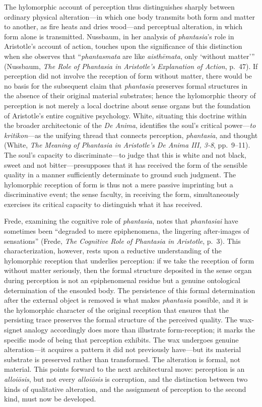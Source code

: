 \documentclass[12pt]{article}
\begin{document}
The hylomorphic account of perception thus distinguishes sharply between ordinary physical alteration---in which one body transmits both form and matter to another, as fire heats and dries wood---and perceptual alteration, in which form alone is transmitted. Nussbaum, in her analysis of \textit{phantasia}'s role in Aristotle's account of action, touches upon the significance of this distinction when she observes that ``\textit{phantasmata} are like \textit{aisthēmata}, only `without matter''' (Nussbaum, \textit{The Role of Phantasia in Aristotle's Explanation of Action}, p.~47). If perception did not involve the reception of form without matter, there would be no basis for the subsequent claim that \textit{phantasia} preserves formal structures in the absence of their original material substrates; hence the hylomorphic theory of perception is not merely a local doctrine about sense organs but the foundation of Aristotle's entire cognitive psychology. White, situating this doctrine within the broader architectonic of the \textit{De Anima}, identifies the soul's critical power---\textit{to kritikon}---as the unifying thread that connects perception, \textit{phantasia}, and thought (White, \textit{The Meaning of Phantasia in Aristotle's De Anima III, 3-8}, pp.~9--11). The soul's capacity to discriminate---to judge that this is white and not black, sweet and not bitter---presupposes that it has received the form of the sensible quality in a manner sufficiently determinate to ground such judgment. The hylomorphic reception of form is thus not a mere passive imprinting but a discriminative event; the sense faculty, in receiving the form, simultaneously exercises its critical capacity to distinguish what it has received.

Frede, examining the cognitive role of \textit{phantasia}, notes that \textit{phantasiai} have sometimes been ``degraded to mere epiphenomena, the lingering after-images of sensations'' (Frede, \textit{The Cognitive Role of Phantasia in Aristotle}, p.~3). This characterization, however, rests upon a reductive understanding of the hylomorphic reception that underlies perception: if we take the reception of form without matter seriously, then the formal structure deposited in the sense organ during perception is not an epiphenomenal residue but a genuine ontological determination of the ensouled body. The persistence of this formal determination after the external object is removed is what makes \textit{phantasia} possible, and it is the hylomorphic character of the original reception that ensures that the persisting trace preserves the formal structure of the perceived quality. The wax-signet analogy accordingly does more than illustrate form-reception; it marks the specific mode of being that perception exhibits. The wax undergoes genuine alteration---it acquires a pattern it did not previously have---but its material substrate is preserved rather than transformed. The alteration is formal, not material. This points forward to the next architectural move: perception is an \textit{alloiōsis}, but not every \textit{alloiōsis} is corruption, and the distinction between two kinds of qualitative alteration, and the assignment of perception to the second kind, must now be developed.
\end{document}
